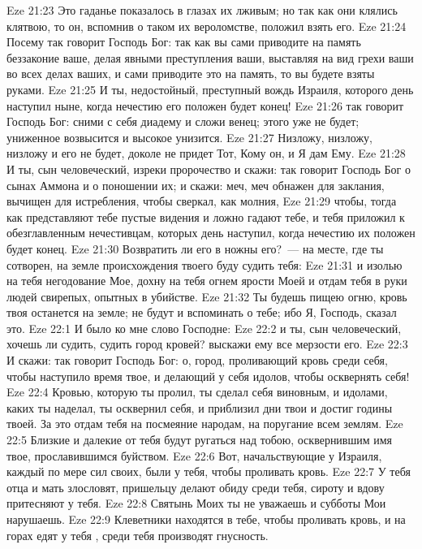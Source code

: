 \vs Eze 21:23 Это гаданье показалось в глазах их лживым; но так как они клялись клятвою, то он, вспомнив о таком их вероломстве, положил взять его.
\vs Eze 21:24 Посему так говорит Господь Бог: так как вы сами приводите на память беззаконие ваше, делая явными преступления ваши, выставляя на вид грехи ваши во всех делах ваших, и сами приводите это на память, то вы будете взяты руками.
\vs Eze 21:25 И ты, недостойный, преступный вождь Израиля, которого день наступил ныне, когда нечестию его положен будет конец!
\vs Eze 21:26 так говорит Господь Бог: сними с себя диадему и сложи венец; этого уже не будет; униженное возвысится и высокое унизится.
\vs Eze 21:27 Низложу, низложу, низложу и его не будет, доколе не придет Тот, Кому  он, и Я дам Ему.
\vs Eze 21:28 И ты, сын человеческий, изреки пророчество и скажи: так говорит Господь Бог о сынах Аммона и о поношении их; и скажи: меч, меч обнажен для заклания, вычищен для истребления, чтобы сверкал, как молния,
\vs Eze 21:29 чтобы, тогда как представляют тебе пустые видения и ложно гадают тебе, и тебя приложил к обезглавленным нечестивцам, которых день наступил, когда нечестию их положен будет конец.
\vs Eze 21:30 Возвратить ли его в ножны его?~--- на месте, где ты сотворен, на земле происхождения твоего буду судить тебя:
\vs Eze 21:31 и изолью на тебя негодование Мое, дохну на тебя огнем ярости Моей и отдам тебя в руки людей свирепых, опытных в убийстве.
\vs Eze 21:32 Ты будешь пищею огню, кровь твоя останется на земле; не будут и вспоминать о тебе; ибо Я, Господь, сказал это.
\vs Eze 22:1 И было ко мне слово Господне:
\vs Eze 22:2 и ты, сын человеческий, хочешь ли судить, судить город кровей? выскажи ему все мерзости его.
\vs Eze 22:3 И скажи: так говорит Господь Бог: о, город, проливающий кровь среди себя, чтобы наступило время твое, и делающий у себя идолов, чтобы осквернять себя!
\vs Eze 22:4 Кровью, которую ты пролил, ты сделал себя виновным, и идолами, каких ты наделал, ты осквернил себя, и приблизил дни твои и достиг годины твоей. За это отдам тебя на посмеяние народам, на поругание всем землям.
\vs Eze 22:5 Близкие и далекие от тебя будут ругаться над тобою, осквернившим имя твое, прославившимся буйством.
\vs Eze 22:6 Вот, начальствующие у Израиля, каждый по мере сил своих, были у тебя, чтобы проливать кровь.
\vs Eze 22:7 У тебя отца и мать злословят, пришельцу делают обиду среди тебя, сироту и вдову притесняют у тебя.
\vs Eze 22:8 Святынь Моих ты не уважаешь и субботы Мои нарушаешь.
\vs Eze 22:9 Клеветники находятся в тебе, чтобы проливать кровь, и на горах едят у тебя , среди тебя производят гнусность.
